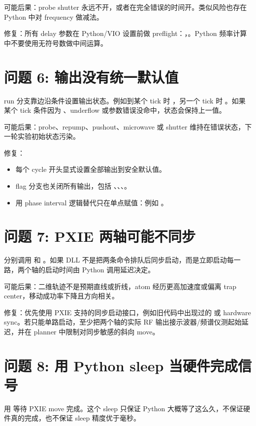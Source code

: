 \documentclass[11pt,oneside,openany]{book}
\begin{document}
可能后果：probe shutter 永远不开，或者在完全错误的时间开。类似风险也存在 Python 中对  frequency 做减法。

修复：所有 delay 参数在 Python/VIO 设置前做 preflight：，。Python 频率计算中不要使用无符号数做中间运算。

\section{问题 6: 输出没有统一默认值}
run 分支靠边沿条件设置输出状态。例如到某个 tick 时 ，另一个 tick 时 。如果某个 tick 条件因为 、underflow 或参数错误没命中，状态会保持上一值。

可能后果：probe、repump、pushout、microwave 或 shutter 维持在错误状态，下一轮实验初始状态污染。

修复：
\begin{itemize}
  \item 每个 cycle 开头显式设置全部输出到安全默认值。
  \item flag 分支也关闭所有输出，包括 、、、。
  \item 用 phase interval 逻辑替代只在单点赋值：例如 。
\end{itemize}

\section{问题 7: PXIE 两轴可能不同步}
 分别调用  和 。如果 DLL 不是把两条命令排队后同步启动，而是立即启动每一路，两个轴的启动时间由 Python 调用延迟决定。

可能后果：二维轨迹不是预期直线或折线，atom 经历更高加速度或偏离 trap center，移动成功率下降且方向相关。

修复：优先使用 PXIE 支持的同步启动接口，例如旧代码中出现过的  或 hardware sync。若只能单路启动，至少把两个轴的实际 RF 输出接示波器/频谱仪测起始延迟，并在 planner 中限制对同步敏感的斜向 move。

\section{问题 8: 用 Python sleep 当硬件完成信号}
 用  等待 PXIE move 完成。这个 sleep 只保证 Python 大概等了这么久，不保证硬件真的完成，也不保证 sleep 精度优于毫秒。
\end{document}

